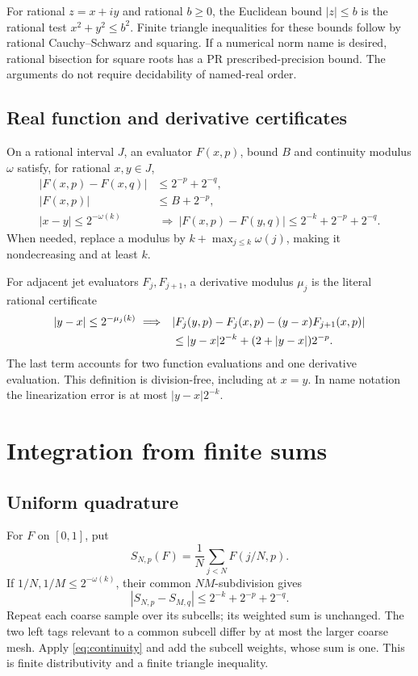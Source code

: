 \documentclass[11pt]{article}
\theoremstyle{definition}
\begin{document}
For rational \(z=x+iy\) and rational \(b\ge0\), the Euclidean bound
\(|z|\le b\) is the rational test \(x^2+y^2\le b^2\).
Finite triangle inequalities for these bounds follow by rational
Cauchy--Schwarz and squaring. If a numerical norm name is desired,
rational bisection for square roots has a PR prescribed-precision bound.
The arguments do not require decidability of named-real order.

\subsection{Real function and derivative certificates}

On a rational interval \(J\), an evaluator \(F(x,p)\), bound \(B\) and
continuity modulus \(\omega\) satisfy, for rational \(x,y\in J\),
\begin{align}
 |F(x,p)-F(x,q)|&\le2^{-p}+2^{-q},\label{eq:coherence}\\
 |F(x,p)|&\le B+2^{-p},\label{eq:bound}\\
 |x-y|\le2^{-\omega(k)}
 &\ \Longrightarrow\
 |F(x,p)-F(y,q)|\le2^{-k}+2^{-p}+2^{-q}.\label{eq:continuity}
\end{align}
When needed, replace a modulus by \(k+\max_{j\le k}\omega(j)\), making it
nondecreasing and at least \(k\).

For adjacent jet evaluators \(F_j,F_{j+1}\), a derivative modulus \(\mu_j\)
is the literal rational certificate
\begin{align}
 |y-x|\le2^{-\mu_j(k)}
 \ \Longrightarrow\quad
 &|F_j(y,p)-F_j(x,p)-(y-x)F_{j+1}(x,p)|\notag\\
 &\le|y-x|2^{-k}+(2+|y-x|)2^{-p}.\label{eq:derivative}
\end{align}
The last term accounts for two function evaluations and one derivative
evaluation. This definition is division-free, including at \(x=y\).
In name notation the linearization error is at most \(|y-x|2^{-k}\).

\section{Integration from finite sums}\label{sec:integration}

\subsection{Uniform quadrature}

For \(F\) on \([0,1]\), put
\begin{equation}\label{eq:rsum}
 S_{N,p}(F)=\frac1N\sum_{j<N}F(j/N,p).
\end{equation}
If \(1/N,1/M\le2^{-\omega(k)}\), their common \(NM\)-subdivision gives
\begin{equation}\label{eq:refinement}
 |S_{N,p}-S_{M,q}|\le2^{-k}+2^{-p}+2^{-q}.
\end{equation}
Repeat each coarse sample over its subcells; its weighted sum is
unchanged. The two left tags relevant to a common subcell differ by
at most the larger coarse mesh. Apply \eqref{eq:continuity} and add the
subcell weights, whose sum is one. This is finite distributivity and
a finite triangle inequality.
\end{document}
